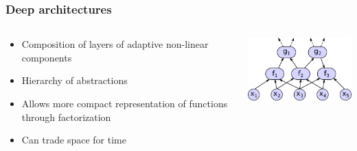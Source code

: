 \begin{frame}
	\frametitle{Deep architectures}
	\begin{columns}
		\begin{column}{5.5cm}
			\begin{itemize}
				\item Composition of layers of adaptive non-linear components
				\item Hierarchy of abstractions
				\item Allows more compact representation of functions through factorization
				\item Can trade space for time
			\end{itemize}
		\end{column}
		\begin{column}{5.5cm}
			\includegraphics[width=5.5cm]{images/deepArchitecture.png}
		\end{column}
	\end{columns}
\end{frame}
